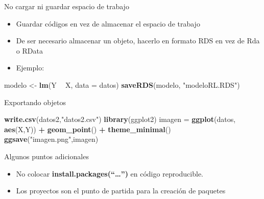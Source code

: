 \documentclass[
  ignorenonframetext,
  aspectratio=169]{beamer}
\newenvironment{Shaded}{\begin{snugshade}}{\end{snugshade}}
\newcommand{\DataTypeTok}[1]{\textcolor[rgb]{0.13,0.29,0.53}{#1}}
\newcommand{\KeywordTok}[1]{\textcolor[rgb]{0.13,0.29,0.53}{\textbf{#1}}}
\newcommand{\NormalTok}[1]{#1}
\newcommand{\OperatorTok}[1]{\textcolor[rgb]{0.81,0.36,0.00}{\textbf{#1}}}
\newcommand{\StringTok}[1]{\textcolor[rgb]{0.31,0.60,0.02}{#1}}
\begin{document}
\begin{frame}[fragile]

\begin{block}{No cargar ni guardar espacio de trabajo}

\begin{itemize}
\item
  Guardar códigos en vez de almacenar el espacio de trabajo
\item
  De ser necesario almacenar un objeto, hacerlo en formato RDS en vez de
  Rda o RData
\item
  Ejemplo:
\end{itemize}

\begin{Shaded}
\begin{Highlighting}[]
\NormalTok{modelo <-}\StringTok{ }\KeywordTok{lm}\NormalTok{(Y }\OperatorTok{~}\StringTok{ }\NormalTok{X, }\DataTypeTok{data =}\NormalTok{ datos)}
\KeywordTok{saveRDS}\NormalTok{(modelo, }\StringTok{"modeloRL.RDS"}\NormalTok{)}
\end{Highlighting}
\end{Shaded}

\end{block}

\end{frame}

\begin{frame}[fragile]{Exportando objetos}
\protect\hypertarget{exportando-objetos}{}

\begin{Shaded}
\begin{Highlighting}[]
\KeywordTok{write.csv}\NormalTok{(datos2,}\StringTok{"datos2.csv"}\NormalTok{)}
\KeywordTok{library}\NormalTok{(ggplot2)}
\NormalTok{imagen =}\StringTok{ }\KeywordTok{ggplot}\NormalTok{(datos, }\KeywordTok{aes}\NormalTok{(X,Y)) }\OperatorTok{+}
\StringTok{  }\KeywordTok{geom_point}\NormalTok{() }\OperatorTok{+}\StringTok{ }\KeywordTok{theme_minimal}\NormalTok{()}
\KeywordTok{ggsave}\NormalTok{(}\StringTok{"imagen.png"}\NormalTok{,imagen)}
\end{Highlighting}
\end{Shaded}

\end{frame}

\begin{frame}{Algunos puntos adicionales}
\protect\hypertarget{algunos-puntos-adicionales}{}

\begin{itemize}
\item
  No colocar \textbf{install.packages(``\ldots{}'')} en código
  reproducible.
\item
  Los proyectos son el punto de partida para la creación de paquetes
\end{itemize}

\end{frame}
\end{document}
